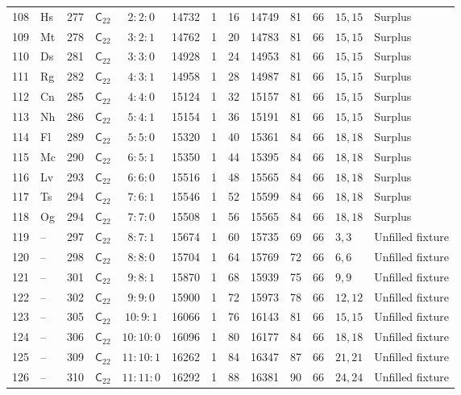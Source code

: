 {\begin{longtable}{@{}rllccrrrrrrll@{}}
108 & Hs & 277 & $\mathsf{C}_{22}$ & $2:2:0$ & 14732 & 1 & 16 & 14749 & 81 & 66 & $15,15$ & Surplus\\
109 & Mt & 278 & $\mathsf{C}_{22}$ & $3:2:1$ & 14762 & 1 & 20 & 14783 & 81 & 66 & $15,15$ & Surplus\\
110 & Ds & 281 & $\mathsf{C}_{22}$ & $3:3:0$ & 14928 & 1 & 24 & 14953 & 81 & 66 & $15,15$ & Surplus\\
111 & Rg & 282 & $\mathsf{C}_{22}$ & $4:3:1$ & 14958 & 1 & 28 & 14987 & 81 & 66 & $15,15$ & Surplus\\
112 & Cn & 285 & $\mathsf{C}_{22}$ & $4:4:0$ & 15124 & 1 & 32 & 15157 & 81 & 66 & $15,15$ & Surplus\\
113 & Nh & 286 & $\mathsf{C}_{22}$ & $5:4:1$ & 15154 & 1 & 36 & 15191 & 81 & 66 & $15,15$ & Surplus\\
114 & Fl & 289 & $\mathsf{C}_{22}$ & $5:5:0$ & 15320 & 1 & 40 & 15361 & 84 & 66 & $18,18$ & Surplus\\
115 & Mc & 290 & $\mathsf{C}_{22}$ & $6:5:1$ & 15350 & 1 & 44 & 15395 & 84 & 66 & $18,18$ & Surplus\\
116 & Lv & 293 & $\mathsf{C}_{22}$ & $6:6:0$ & 15516 & 1 & 48 & 15565 & 84 & 66 & $18,18$ & Surplus\\
117 & Ts & 294 & $\mathsf{C}_{22}$ & $7:6:1$ & 15546 & 1 & 52 & 15599 & 84 & 66 & $18,18$ & Surplus\\
118 & Og & 294 & $\mathsf{C}_{22}$ & $7:7:0$ & 15508 & 1 & 56 & 15565 & 84 & 66 & $18,18$ & Surplus\\
119 & -- & 297 & $\mathsf{C}_{22}$ & $8:7:1$ & 15674 & 1 & 60 & 15735 & 69 & 66 & $3,3$ & Unfilled fixture\\
120 & -- & 298 & $\mathsf{C}_{22}$ & $8:8:0$ & 15704 & 1 & 64 & 15769 & 72 & 66 & $6,6$ & Unfilled fixture\\
121 & -- & 301 & $\mathsf{C}_{22}$ & $9:8:1$ & 15870 & 1 & 68 & 15939 & 75 & 66 & $9,9$ & Unfilled fixture\\
122 & -- & 302 & $\mathsf{C}_{22}$ & $9:9:0$ & 15900 & 1 & 72 & 15973 & 78 & 66 & $12,12$ & Unfilled fixture\\
123 & -- & 305 & $\mathsf{C}_{22}$ & $10:9:1$ & 16066 & 1 & 76 & 16143 & 81 & 66 & $15,15$ & Unfilled fixture\\
124 & -- & 306 & $\mathsf{C}_{22}$ & $10:10:0$ & 16096 & 1 & 80 & 16177 & 84 & 66 & $18,18$ & Unfilled fixture\\
125 & -- & 309 & $\mathsf{C}_{22}$ & $11:10:1$ & 16262 & 1 & 84 & 16347 & 87 & 66 & $21,21$ & Unfilled fixture\\
126 & -- & 310 & $\mathsf{C}_{22}$ & $11:11:0$ & 16292 & 1 & 88 & 16381 & 90 & 66 & $24,24$ & Unfilled fixture\\
\end{longtable}
}
